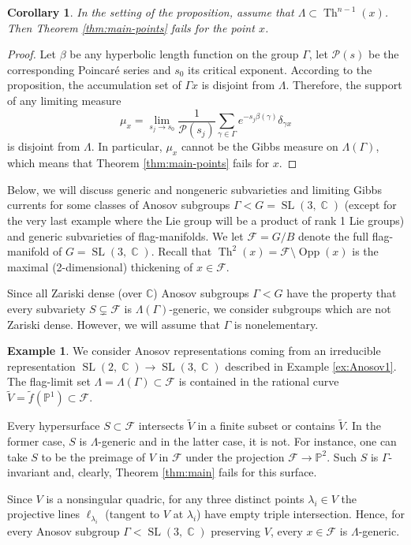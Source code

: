 \documentclass[12pt]{amsbook}%
\newtheorem{cor}[thm]{Corollary}
\theoremstyle{definition}
\newtheorem{example}[thm]{Example}
\theoremstyle{remark}
\numberwithin{section}{chapter}
\numberwithin{subsection}{section}
\numberwithin{figure}{chapter}
\DeclareMathOperator{\C}{\mathbb{C}}
\DeclareMathOperator{\SL}{SL}
\DeclareMathOperator{\Th}{Th}
\DeclareMathOperator{\Opp}{Opp}
\def\bC{{\mathbb{C}}}
\def\P{{\mathbb{P}}}
\def\cF{{\mathscr{F}}}
\def\cP{{\mathscr{P}}}
\def\Ga{\Gamma}
\def\ga{\gamma}
\def\La{\Lambda}
\begin{document}
{{\begin{cor}
In the setting of the proposition, assume that $\La\subset \Th^{n-1}(x)$. Then 
Theorem \ref{thm:main-points} fails for the point $x$. 
\end{cor}
\begin{proof} Let $\beta$ be any hyperbolic length function on the group $\Ga$, let  
$\cP(s)$ be the corresponding Poincar\'e series and $s_0$ its critical exponent. According to the proposition, the accumulation set of 
$\Ga x$ is disjoint from $\La$. 
Therefore, the support of any limiting measure 
$$
\mu_{x}= \lim_{s_j\to s_0} \frac{1}{\cP(s_j)} \sum_{\ga\in \Ga} e^{-s_j\beta(\ga)} \delta_{\ga x}
$$
is disjoint from $\La$. In particular, $\mu_x$ cannot be the Gibbs measure on $\La(\Ga)$, which means that 
Theorem \ref{thm:main-points} fails for $x$. 
\end{proof}


Below,  we will discuss generic and nongeneric subvarieties and limiting Gibbs currents for some classes of Anosov subgroups $\Ga< G=\SL(3,\C)$  (except for the very last example where the Lie group will be a product of rank 1 Lie groups) and generic subvarieties of flag-manifolds. We let $\cF=G/B$ denote the full flag-manifold of $G=\SL(3,\C)$. Recall that $\Th^2(x)= \cF\setminus \Opp(x)$ is the maximal (2-dimensional) thickening of $x\in \cF$. 


Since all Zariski dense (over $\bC$) Anosov subgroups $\Ga< G$ have the property that every subvariety $S\subsetneq \cF$ is $\La(\Ga)$-generic, we consider subgroups which are not Zariski dense. However, we will assume that $\Ga$ is nonelementary. 


\begin{example}\label{ex:E1}
We consider Anosov representations coming from an irreducible representation 
$\SL(2,\C)\to \SL(3,\C)$ described in Example \ref{ex:Anosov1}. 
The flag-limit set $\La=\La(\Ga)\subset \cF$ is contained in the rational curve 
$\tilde V=\tilde f(\P^1)\subset \cF$. 

Every hypersurface $S\subset  {\mathcal F}$ intersects $\tilde V$ in a finite subset or contains $\tilde V$. In the former case, $S$ is $\La$-generic and in the latter case, it is not. For instance, one can take $S$ to be the preimage of $V$ in $\cF$ under the projection $\cF\to \P^2$. Such $S$ is $\Ga$-invariant and, clearly, Theorem \ref{thm:main} fails for this surface. 

Since $V$ is a nonsingular quadric, for any three distinct points $\lambda_i\in V$ the projective lines $\ell_{\lambda_i}$ 
(tangent to $V$ at $\lambda_i$) have empty triple intersection.   
Hence, for every Anosov subgroup $\Gamma< \SL(3,\C)$ preserving $V$, every 
$x\in \cF$  is $\Lambda$-generic. 


\end{example}}}
\end{document}
